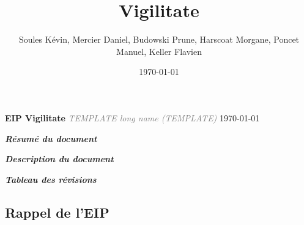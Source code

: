 \documentclass[a4paper,12pt]{report}
\title{\doctitle{} Vigilitate}
\author{Soules Kévin, Mercier Daniel, Budowski Prune, Harscoat Morgane, Poncet Manuel, Keller Flavien}
\date{\today}
\newcommand{\doctitle}{TEMPLATE}
\newcommand{\doclongtitle}{TEMPLATE long name}
\begin{document}
\setcounter{page}{-10}


\pagestyle{empty}
\begin{center}\textcolor{myBlue}{\Huge \textbf{EIP Vigilitate}}\linebreak
\pagestyle{eip}
\textcolor{gray}{\textit{\Large \doclongtitle{} (\doctitle{})}}\linebreak
{}
{\today}\end{center}
\newpage
{}
\begin{flushleft}\textcolor{myBlue}{\textit{\large \textbf{Résumé du document}}} \linebreak \end{flushleft}
\pagestyle{eip}


\newpage
\begin{flushleft}
\textcolor{myBlue}{\textit{\large \textbf{Description du document}}} 
\bigbreak
\pagestyle{eip}

\bigbreak
\bigbreak
\textcolor{myBlue}{\textit{\large \textbf{Tableau des révisions}}}
\bigbreak
\pagestyle{eip}


\end{flushleft}
\tableofcontents
\thispagestyle{eip}


\textcolor{myBlue}{\chapter{Rappel de l'EIP}}

\setcounter{page}{1}
\thispagestyle{eip}





\end{document}
